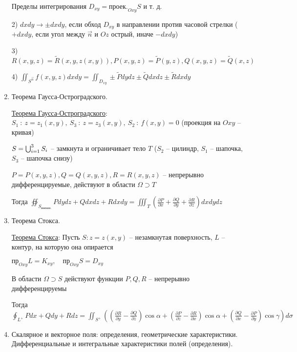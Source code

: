 \documentclass[12pt]{article}
\begin{document}
\begin{enumerate}
        Пределы интегрирования $D_{xy} = \text{проек.}_{Oxy} S$ и т. д.

        2) $dxdy \to \pm dxdy$, если обход $D_{xy}$ в направлении против часовой стрелки ($+dxdy$, если угол между $\overrightarrow{n}$ и $Oz$ острый, иначе $-dxdy$)

        3) $R(x, y, z) = \tilde{R}(x, y, z(x, y)), P(x, y, z) = \tilde{P}(y, z), Q(x, y, z) = \tilde{Q}(x, z)$

        4) $\iint_{S^{\overrightarrow{n}}} f(x, y, z) dxdy = \iint_{D_{xy}} \pm \tilde{P}dydz \pm \tilde{Q}dxdz \pm \tilde{R}dxdy$

        \item Теорема Гаусса-Остроградского.

        \hyperlink{theoremGaussOstrogradskyy}{Теорема Гаусса-Остроградского}:
        $S_1\ : \ z = z_1(x, y),\ S_3\ :\ z = z_3(x, y),\ S_2\ : \ f(x, y) = 0$ (проекция на $Oxy$ -- кривая)

        $S = \bigcup_{i = 1}^3 S_i$ -- замкнута и ограничивает тело $T$ ($S_2$ -- цилиндр, $S_1$ -- шапочка, $S_3$ -- шапочка снизу)

        $P = P(x, y, z), Q = Q(x, y, z), R = R(x, y, z)$ -- непрерывно дифференцируемые, действуют в области $\Omega \supset T$

        Тогда $\oiint_{S_{\text{внешн.}}} Pdydz + Qdxdz + Rdxdy = \iiint_T \left(\frac{\partial P}{\partial x} + \frac{\partial Q}{\partial y} + \frac{\partial R}{\partial z}\right) dxdydz$


        \item Теорема Стокса.

        \hyperlink{theoremStokes}{Теорема Стокса}: Пусть $S : z = z(x, y)$ -- незамкнутая поверхность, $L$ -- контур, на которую она опирается

        $\text{пр}_{Oxy} L = K_{xy}, \quad \text{пр}_{Oxy} S = D_{xy}$

        В области $\Omega \supset S$ действуют функции $P, Q, R$ -- непрерывно дифференцируемы

        Тогда $\oint_{L^+} Pdx + Qdy + Rdz = \iint_{S^+} \left(\left(\frac{\partial R}{\partial y} - \frac{\partial Q}{\partial z}\right)\cos\alpha +
        \left(\frac{\partial P}{\partial z} - \frac{\partial R}{\partial x}\right)\cos\alpha + \left(\frac{\partial Q}{\partial x} - \frac{\partial P}{\partial y}\right)\cos\gamma\right) d\sigma$


        \item Скалярное и векторное поля: определения, геометрические характеристики. Дифференциальные и интегральные характеристики полей (определения).


\end{enumerate}
\end{document}
